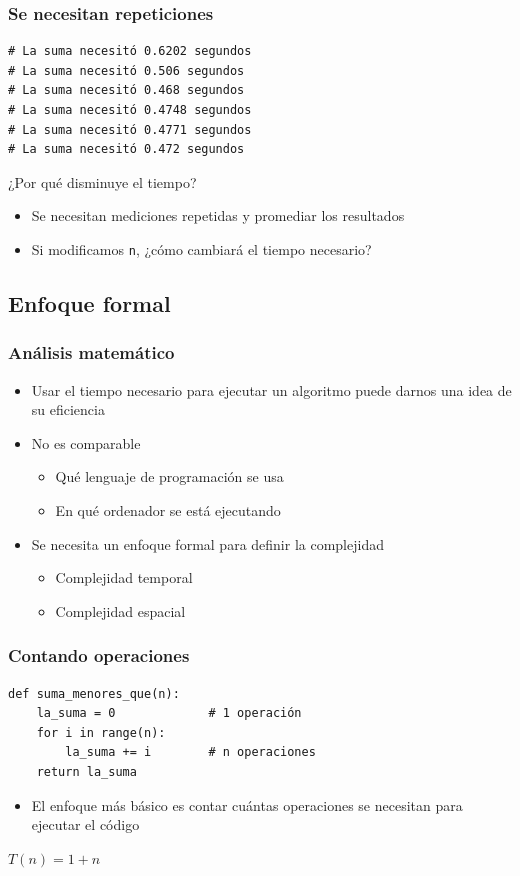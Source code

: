 \documentclass[11pt]{beamer}
\begin{document}
	\begin{frame}[fragile]\frametitle{Se necesitan repeticiones}
	\begin{lstlisting}
# La suma necesitó 0.6202 segundos
# La suma necesitó 0.506 segundos
# La suma necesitó 0.468 segundos
# La suma necesitó 0.4748 segundos
# La suma necesitó 0.4771 segundos
# La suma necesitó 0.472 segundos
\end{lstlisting}
	\begin{block}{}
	\centering ¿Por qué disminuye el tiempo?
	\end{block}
	\pause
	\begin{itemize}
	\item Se necesitan mediciones repetidas y promediar los resultados
	\item Si modificamos \texttt{n}, ¿cómo cambiará el tiempo necesario?
	\end{itemize}
	\end{frame}

	\subsection{Enfoque formal}

	\begin{frame}\frametitle{Análisis matemático}
	\begin{itemize}
	\item Usar el tiempo necesario para ejecutar un algoritmo puede darnos una idea de su eficiencia
	\pause
	\item No es comparable 
	\begin{itemize}
	\item Qué lenguaje de programación se usa
	\item En qué ordenador se está ejecutando
	\end{itemize}
	\pause
	\item Se necesita un enfoque formal para definir la complejidad
	\begin{itemize}
	\item Complejidad temporal
	\item Complejidad espacial
	\end{itemize}
	\end{itemize}
	\end{frame}

	\begin{frame}[fragile]\frametitle{Contando operaciones}
	\begin{lstlisting}
def suma_menores_que(n):
    la_suma = 0				# 1 operación
    for i in range(n):
        la_suma += i		# n operaciones
    return la_suma
\end{lstlisting}
	\begin{itemize}
	\item El enfoque más básico es contar cuántas operaciones se necesitan para ejecutar el código
	\end{itemize}
	\pause
	\begin{block}{}
	\centering$T(n) = 1 + n$
	\end{block}
	\end{frame}
\end{document}
